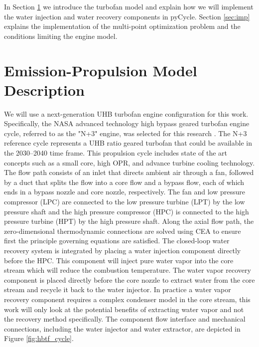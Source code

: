 \documentclass[conf]{new-aiaa}
\begin{document}
In Section \ref{sec:epModel} we introduce the turbofan model and explain how we will implement the water injection and water recovery components in pyCycle.
Section \ref{sec:imp} explains the implementation of the multi-point optimization problem and the conditions limiting the engine model.

\section{Emission-Propulsion Model Description}
\label{sec:epModel}
We will use a next-generation UHB turbofan engine configuration for this work.
Specifically, the NASA advanced technology high bypass geared turbofan engine cycle, referred to as the "N+3" engine, was selected for this research \cite{Hendricks2019}.
The N+3 reference cycle represents a UHB ratio geared turbofan that could be available in the 2030–2040 time frame.
This propulsion cycle includes state of the art concepts such as a small core, high OPR, and advance turbine cooling technology.
The flow path consists of an inlet that directs ambient air through a fan, followed by a duct that splits the flow into a core flow and a bypass flow, each of which ends in a bypass nozzle and core nozzle, respectively.
The fan and low pressure compressor (LPC) are connected to the low pressure turbine (LPT) by the low pressure shaft and the high pressure compressor (HPC) is connected to the high pressure turbine (HPT) by the high pressure shaft.
Along the axial flow path, the zero-dimensional thermodynamic connections are solved using CEA to ensure first the principle governing equations are satisfied.
The closed-loop water recovery system is integrated by placing a water injection component directly before the HPC.
This component will inject pure water vapor into the core stream which will reduce the combustion temperature.
The water vapor recovery component is placed directly before the core nozzle to extract water from the core stream and recycle it back to the water injector.
In practice a water vapor recovery component requires a complex condenser model in the core stream, this work will only look at the potential benefits of extracting water vapor and not the recovery method specifically.
The component flow interface and mechanical connections, including the water injector and water extractor, are depicted in Figure \ref{fig:hbtf_cycle}.
\end{document}
